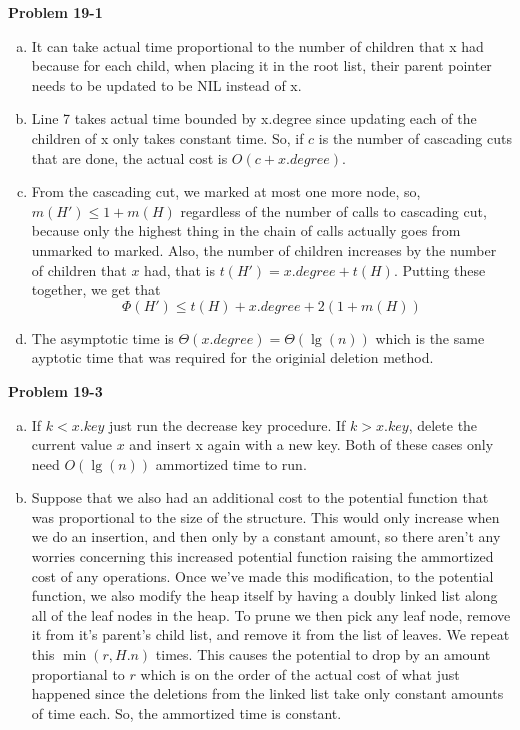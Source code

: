 \documentclass{article}
\begin{document}
\noindent\textbf{Problem 19-1}\\
\begin{enumerate}[a.]
\item It can take actual time proportional to the number of children that x had because for each child, when placing it in the root list, their parent pointer needs to be updated to be NIL instead of x.

\item Line 7 takes actual time bounded by x.degree since updating each of the children of x only takes constant time. So, if $c$ is the number of cascading cuts that are done, the actual cost is $O(c+x.degree)$.

\item From the cascading cut, we marked at most one more node, so, $m(H') \le 1 + m(H)$ regardless of the number of calls to cascading cut, because only the highest thing in the chain of calls actually goes from unmarked to marked. Also, the number of children increases by the number of children that $x$ had, that is $t(H') = x.degree + t(H)$. Putting these together, we get that
\[
\Phi(H') \le t(H)+ x.degree + 2(1+m(H))
\]

\item The asymptotic time is $\Theta(x.degree) = \Theta(\lg(n))$ which is the same ayptotic time that was required for the originial deletion method.

\end{enumerate}

\noindent\textbf{Problem 19-3}\\
\begin{enumerate}[a.]
\item
If $k<x.key$ just run the decrease key procedure. If $k>x.key$, delete the current value $x$ and insert x again with a new key. Both of these cases only need $O(\lg(n))$ ammortized time to run.
\item
Suppose that we also had an additional cost to the potential function that was proportional to the size of the structure. This would only increase when we do an insertion, and then only by a constant amount, so there aren't any worries concerning this increased potential function raising the ammortized cost of any operations. Once we've made this modification, to the potential function, we also modify the heap itself by having a doubly linked list along all of the leaf nodes in the heap. To prune we then pick any leaf node, remove it from it's parent's child list, and remove it from the list of leaves. We repeat this $\min(r,H.n)$ times. This causes the potential to drop by an amount proportianal to $r$ which is on the order of the actual cost of what just happened since the deletions from the linked list take only constant amounts of time each. So, the ammortized time is constant.\\

\end{enumerate}
\end{document}
